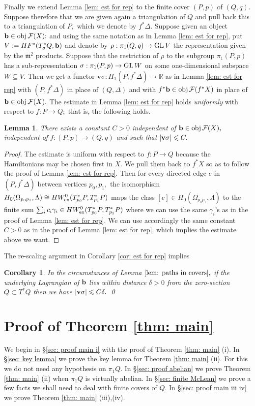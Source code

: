 \documentclass{article}
\theoremstyle{plain}%
\newtheorem{lem}[thm]{Lemma}
\newtheorem{cor}[thm]{Corollary}
\theoremstyle{definition}
\numberwithin{equation}{section}
\numberwithin{figure}{section}
\def\l{\label}
\def\fm{{\mathfrak m}}
\def\GL{\mathop{\rm GL}}
\def\le{\leqslant\nobreak}
\def\cF{{\mathbin{\cal F}}}
\def\R{{\mathbin{\mathbb R}}}
\def\ga{\gamma}
\def\de{\delta}
\def\si{\sigma}
\def\De{\Delta}
\def\La{\Lambda}
\def\Om{\Omega}
\def\sb{\subseteq}
\def\v{{\mathbf{v}}}\def\cl{{\rm cl}}\def\alg{{\rm alg}}\def\geom{{\rm geom}}\def\loc{{\rm loc}}\def\dirlim{\displaystyle\varinjlim}
\def\ex{{   {\rm ex}    }}\def\virt{{   {\rm virt}    }}\def\ev{{\rm ev}}\def\sing{{\rm sing}}\def\cont{{\rm cont}}
\begin{document}
Finally we extend Lemma \ref{lem: est for rep} to the finite cover $(P,p)$ of $(Q,q).$ Suppose therefore that we are given again a triangulation of $Q$ and pull back this to a triangulation of $P,$ which we denote by $f^*\De.$ Suppose given an object $\b\in\obj\cF(X);$ and using the same notation as in Lemma \ref{lem: est for rep}, put $V:=HF^*(T_q^*Q,{\mathbf{b}})$ and denote by $\rho: \pi_1(Q,q)\to \GL V$ the representation given by the $\fm^2$ products. Suppose that the restriction of $\rho$ to the subgroup $\pi_1(P,p)$ has a sub-representation $\si:\pi_1(P,p)\to \GL W$ on some one-dimensional subspace $W\sb V.$ Then we get a functor $\v\si:\Pi_1(P,f^*\De)\to\R$ as in Lemma \ref{lem: est for rep} with $(P,f^*\De)$ in place of $(Q,\De)$ and with $f^*\b\in\obj \cF(f^*X)$ in place of $\b\in\obj\cF(X).$ The estimate in Lemma \ref{lem: est for rep} holds {\it uniformly} with respect to $f:P\to Q;$ that is, the following holds. 
\begin{lem}\l{lem: paths in covers}
There exists a constant $C>0$ independent of $\b\in\obj\cF(X),$ independent of $f:(P,p)\to (Q,q)$ and such that $|\v\si|\le C.$
\end{lem}
\begin{proof}
The estimate is uniform with respect to $f:P\to Q$ because the Hamiltonians may be chosen first in $X.$ We pull them back to $f^*X$ so as to follow the proof of Lemma \ref{lem: est for rep}. Then for every directed edge $e$ in $(P,f^*\De)$ between vertices $p_0,p_1,$ the isomorphism $H_0(\Om_{p_0p_1},\La)\cong HW_\ex^0(T_{p_0}^*P,T_{p_1}^*P)$ maps the class $[e]\in H_0(\Om_{p_0p_1},\La)$ to the finite  sum $\sum_ic_i\ga_i\in HW_\ex^0(T_{p_0}^*P,T_{p_1}^*P)$ where we can use the same $\ga_i$'s as in the proof of Lemma \ref{lem: est for rep}. We can use accordingly the same constant $C>0$ as in the proof of Lemma \ref{lem: est for rep}, which implies the estimate above we want. 
\end{proof}
The re-scaling argument in Corollary \ref{cor: est for rep} implies 
\begin{cor}\l{cor: paths in covers}
In the circumstances of Lemma $\ref{lem: paths in covers},$ if the underlying Lagrangian of ${\mathbf{b}}$ lies within distance $\de>0$ from the zero-section $Q\subset T^*Q$ then we have $|\v\si|\le C\de.$ \qed
\end{cor}


\section{Proof of Theorem \ref{thm: main}}\l{sec: proof}
We begin in \S\ref{sec: proof main i} with the proof of Theorem \ref{thm: main} (i). 
In \S\ref{sec: key lemma} we prove the key lemma for Theorem \ref{thm: main} (ii). For this we do not need any hypothesis on $\pi_1Q.$
In \S\ref{sec: proof abelian} we prove Theorem \ref{thm: main} (ii) when $\pi_1Q$ is virtually abelian.
In \S\ref{sec: finite McLean} we prove a few facts we shall need to deal with finite covers of $Q.$
In \S\ref{sec: proof main iii iv} we prove Theorem \ref{thm: main} (iii),(iv).
\end{document}
